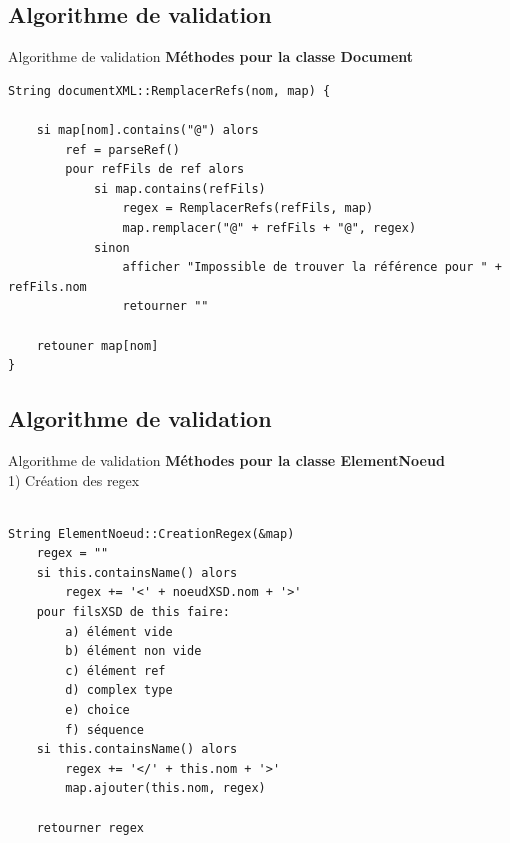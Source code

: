 \documentclass[aspectratio=169]{beamer}
\begin{document}
\subsection{Algorithme de  validation}
\begin{frame}[fragile]{Algorithme de validation}
	\textbf{Méthodes pour la classe Document}
	\scriptsize
	\begin{verbatim}
String documentXML::RemplacerRefs(nom, map) {

    si map[nom].contains("@") alors
        ref = parseRef()
        pour refFils de ref alors 
            si map.contains(refFils)
                regex = RemplacerRefs(refFils, map)
                map.remplacer("@" + refFils + "@", regex)
            sinon
                afficher "Impossible de trouver la référence pour " + refFils.nom
                retourner ""
    
    retouner map[nom]
}

	\end{verbatim}
\end{frame}

\subsection{Algorithme de  validation}
\begin{frame}[fragile]{Algorithme de validation}
	\textbf{Méthodes pour la classe ElementNoeud}\\ [0.2cm]
	1) Création des regex
	\scriptsize
	\begin{verbatim}

String ElementNoeud::CreationRegex(&map)
    regex = ""
    si this.containsName() alors
        regex += '<' + noeudXSD.nom + '>'
    pour filsXSD de this faire:
        a) élément vide
        b) élément non vide
        c) élément ref
        d) complex type
        e) choice
        f) séquence
    si this.containsName() alors
        regex += '</' + this.nom + '>'
        map.ajouter(this.nom, regex)
    
    retourner regex
	\end{verbatim}
\end{frame}
\end{document}
